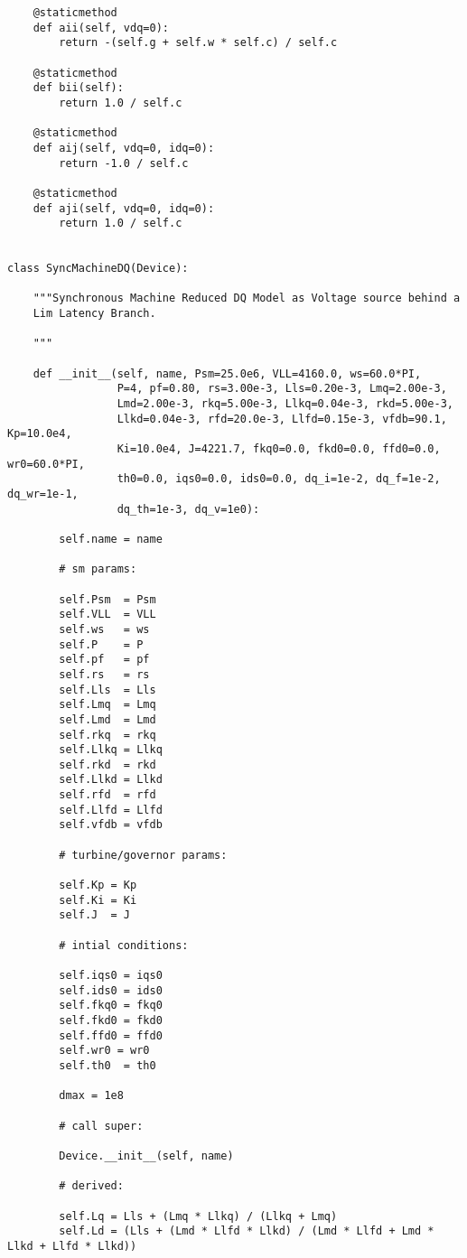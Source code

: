 \begin{lstlisting}
    @staticmethod
    def aii(self, vdq=0):
        return -(self.g + self.w * self.c) / self.c

    @staticmethod
    def bii(self):
        return 1.0 / self.c

    @staticmethod
    def aij(self, vdq=0, idq=0):
        return -1.0 / self.c

    @staticmethod
    def aji(self, vdq=0, idq=0):
        return 1.0 / self.c


class SyncMachineDQ(Device):

    """Synchronous Machine Reduced DQ Model as Voltage source behind a
    Lim Latency Branch.

    """

    def __init__(self, name, Psm=25.0e6, VLL=4160.0, ws=60.0*PI,
                 P=4, pf=0.80, rs=3.00e-3, Lls=0.20e-3, Lmq=2.00e-3,
                 Lmd=2.00e-3, rkq=5.00e-3, Llkq=0.04e-3, rkd=5.00e-3,
                 Llkd=0.04e-3, rfd=20.0e-3, Llfd=0.15e-3, vfdb=90.1, Kp=10.0e4,
                 Ki=10.0e4, J=4221.7, fkq0=0.0, fkd0=0.0, ffd0=0.0, wr0=60.0*PI,
                 th0=0.0, iqs0=0.0, ids0=0.0, dq_i=1e-2, dq_f=1e-2, dq_wr=1e-1,
                 dq_th=1e-3, dq_v=1e0):

        self.name = name

        # sm params:

        self.Psm  = Psm
        self.VLL  = VLL
        self.ws   = ws
        self.P    = P
        self.pf   = pf
        self.rs   = rs
        self.Lls  = Lls
        self.Lmq  = Lmq
        self.Lmd  = Lmd
        self.rkq  = rkq
        self.Llkq = Llkq
        self.rkd  = rkd
        self.Llkd = Llkd
        self.rfd  = rfd
        self.Llfd = Llfd
        self.vfdb = vfdb

        # turbine/governor params:

        self.Kp = Kp
        self.Ki = Ki
        self.J  = J

        # intial conditions:

        self.iqs0 = iqs0
        self.ids0 = ids0
        self.fkq0 = fkq0
        self.fkd0 = fkd0
        self.ffd0 = ffd0
        self.wr0 = wr0
        self.th0  = th0

        dmax = 1e8

        # call super:

        Device.__init__(self, name)

        # derived:

        self.Lq = Lls + (Lmq * Llkq) / (Llkq + Lmq)
        self.Ld = (Lls + (Lmd * Llfd * Llkd) / (Lmd * Llfd + Lmd * Llkd + Llfd * Llkd))


\end{lstlisting}
